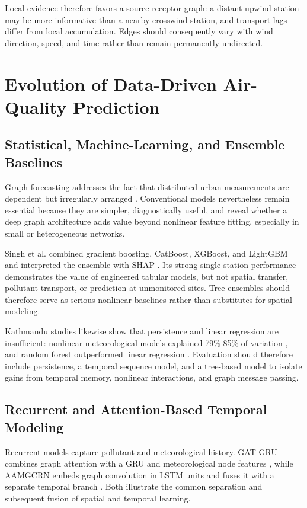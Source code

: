 Local evidence therefore favors a source-receptor graph: a distant upwind station may be more informative than a nearby crosswind station, and transport lags differ from local accumulation. Edges should consequently vary with wind direction, speed, and time rather than remain permanently undirected.

\section{Evolution of Data-Driven Air-Quality Prediction}

\subsection{Statistical, Machine-Learning, and Ensemble Baselines}

Graph forecasting addresses the fact that distributed urban measurements are dependent but irregularly arranged \cite{ref11}. Conventional models nevertheless remain essential because they are simpler, diagnostically useful, and reveal whether a deep graph architecture adds value beyond nonlinear feature fitting, especially in small or heterogeneous networks.

Singh et al. combined gradient boosting, CatBoost, XGBoost, and LightGBM and interpreted the ensemble with SHAP \cite{ref12}. Its strong single-station performance demonstrates the value of engineered tabular models, but not spatial transfer, pollutant transport, or prediction at unmonitored sites. Tree ensembles should therefore serve as serious nonlinear baselines rather than substitutes for spatial modeling.

Kathmandu studies likewise show that persistence and linear regression are insufficient: nonlinear meteorological models explained 79\%-85\% of variation \cite{ref5}, and random forest outperformed linear regression \cite{ref9}. Evaluation should therefore include persistence, a temporal sequence model, and a tree-based model to isolate gains from temporal memory, nonlinear interactions, and graph message passing.

\subsection{Recurrent and Attention-Based Temporal Modeling}

Recurrent models capture pollutant and meteorological history. GAT-GRU combines graph attention with a GRU and meteorological node features \cite{ref13}, while AAMGCRN embeds graph convolution in LSTM units and fuses it with a separate temporal branch \cite{ref16}. Both illustrate the common separation and subsequent fusion of spatial and temporal learning.

